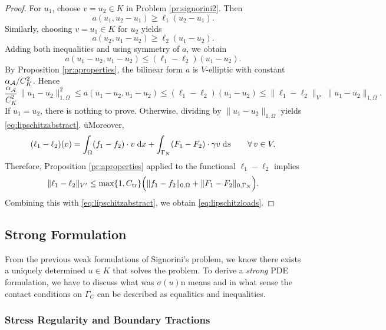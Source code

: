 \begin{proof}
	For $u_1$, choose $v=u_2\in K$ in Problem \ref{pr:signorini2}. Then
	\begin{equation*}
		a(u_1,u_2-u_1)\ge \ell_1(u_2-u_1).
	\end{equation*}
	Similarly, choosing $v=u_1\in K$ for $u_2$ yields
	\begin{equation*}
		a(u_2,u_1-u_2)\ge \ell_2(u_1-u_2).
	\end{equation*}
	Adding both inequalities and using symmetry of $a$, we obtain
	\begin{equation*}
		a(u_1-u_2,u_1-u_2)\le (\ell_1-\ell_2)(u_1-u_2).
	\end{equation*}
	By Proposition \ref{pr:aproperties}, the bilinear form $a$ is $V$-elliptic with constant $\alpha_{\mathcal A}/C_K^2$. Hence
	\begin{equation*}
		\frac{\alpha_\mathcal{A}}{C_K^2}\,\|u_1-u_2\|_{1,\Omega}^2
		\le a(u_1-u_2,u_1-u_2)
		\le (\ell_1-\ell_2)(u_1-u_2)
		\le \|\ell_1-\ell_2\|_{V'}\,\|u_1-u_2\|_{1,\Omega}.
	\end{equation*}
	If $u_1=u_2$, there is nothing to prove. Otherwise, dividing by $\|u_1-u_2\|_{1,\Omega}$ yields \eqref{eq:lipschitzabstract}. üMoreover,
	\begin{equation*}
		(\ell_1-\ell_2)(v)
		=\int_\Omega (f_1-f_2)\cdot v\;{{\mathrm{d}} x}+\int_{\Gamma_N} (F_1-F_2)\cdot \gamma v\;{{\mathrm{d}} s}
		\qquad \forall\, v\in V.
	\end{equation*}
	Therefore, Proposition \ref{pr:aproperties} applied to the functional $\ell_1-\ell_2$ implies
	\begin{equation*}
		\|\ell_1-\ell_2\|_{V'}
		\le \max\{1,C_\mathrm{tr}\}
		\Bigl(\|f_1-f_2\|_{0,\Omega}+\|F_1-F_2\|_{0,\Gamma_N}\Bigr).
	\end{equation*}
	Combining this with \eqref{eq:lipschitzabstract}, we obtain \eqref{eq:lipschitzloads}.
\end{proof}

\subsection{Strong Formulation}
From the previous weak formulations of Signorini's problem, we know there exists a uniquely determined $u\in K$ that solves the problem. To derive a {\em strong} PDE formulation, we have to discuss what was $\sigma(u)\mathrm{n}$ means and in what sense the contact conditions on $\Gamma_C$ can be described as equalities and inequalities.
\subsubsection{Stress Regularity and Boundary Tractions}

